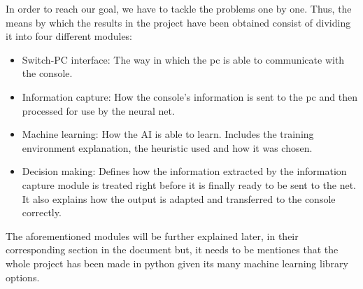 In order to reach our goal, we have to tackle the problems one by one. Thus, the means by which the results in the project have been obtained consist of dividing it into four different modules:
\begin{itemize}
	\item	Switch-PC interface: The way in which the pc is able to communicate with the console.

\item	Information capture: How the console’s information is sent to the pc and then processed for use by the neural net.

\item	Machine learning: How the AI is able to learn. Includes the training environment explanation, the heuristic used and how it was chosen.

\item	Decision making: Defines how the information extracted by the information capture module is treated right before it is finally ready to be sent to the net. It also explains how the output is adapted and transferred to the console correctly.
\end{itemize}

The aforementioned modules will be further explained later, in their corresponding section in the document but, it needs to be mentiones that the whole project has been made in python given its many machine learning library options.








